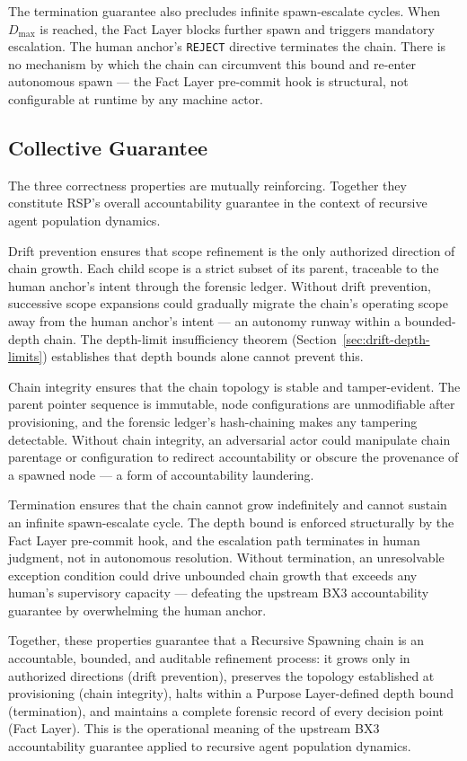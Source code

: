 \medskip
The termination guarantee also precludes infinite spawn-escalate cycles. When $D_{\text{max}}$ is reached, the Fact Layer blocks further spawn and triggers mandatory escalation. The human anchor's \texttt{REJECT} directive terminates the chain. There is no mechanism by which the chain can circumvent this bound and re-enter autonomous spawn — the Fact Layer pre-commit hook is structural, not configurable at runtime by any machine actor.

\subsection{Collective Guarantee}
\label{sec:rs-collective-guarantee}

The three correctness properties are mutually reinforcing. Together they constitute RSP's overall accountability guarantee in the context of recursive agent population dynamics.

\medskip
Drift prevention ensures that scope refinement is the only authorized direction of chain growth. Each child scope is a strict subset of its parent, traceable to the human anchor's intent through the forensic ledger. Without drift prevention, successive scope expansions could gradually migrate the chain's operating scope away from the human anchor's intent — an autonomy runway within a bounded-depth chain. The depth-limit insufficiency theorem (Section~\ref{sec:drift-depth-limits}) establishes that depth bounds alone cannot prevent this.

Chain integrity ensures that the chain topology is stable and tamper-evident. The parent pointer sequence is immutable, node configurations are unmodifiable after provisioning, and the forensic ledger's hash-chaining makes any tampering detectable. Without chain integrity, an adversarial actor could manipulate chain parentage or configuration to redirect accountability or obscure the provenance of a spawned node — a form of accountability laundering.

Termination ensures that the chain cannot grow indefinitely and cannot sustain an infinite spawn-escalate cycle. The depth bound is enforced structurally by the Fact Layer pre-commit hook, and the escalation path terminates in human judgment, not in autonomous resolution. Without termination, an unresolvable exception condition could drive unbounded chain growth that exceeds any human's supervisory capacity — defeating the upstream BX3 accountability guarantee by overwhelming the human anchor.

Together, these properties guarantee that a Recursive Spawning chain is an accountable, bounded, and auditable refinement process: it grows only in authorized directions (drift prevention), preserves the topology established at provisioning (chain integrity), halts within a Purpose Layer-defined depth bound (termination), and maintains a complete forensic record of every decision point (Fact Layer). This is the operational meaning of the upstream BX3 accountability guarantee applied to recursive agent population dynamics.
